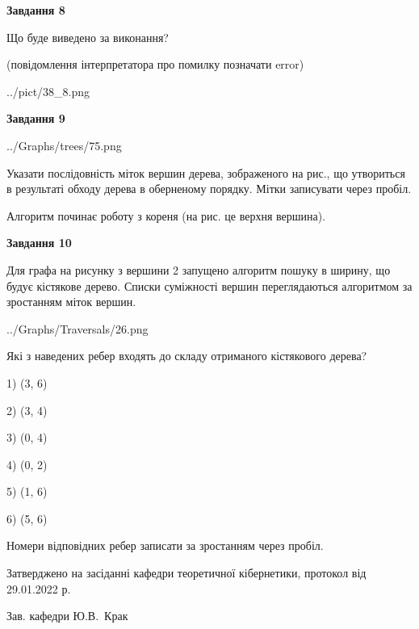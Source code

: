 \documentclass[12pt, ukrainian]{article}
\begin{document}
{\begin {large}
{\begin {center}\textbf{Завдання 8}\end {center}}\par
Що буде виведено за виконання?\par
 (повідомлення інтерпретатора про помилку позначати error)\par
\begin{center}
	{../pict/38_8.png}
\end{center}
\newpage

{\begin {center}\textbf{Завдання 9}\end {center}}\par

\begin{center}
	{../Graphs/trees/75.png}
\end{center}
Указати послідовність міток вершин дерева, зображеного на рис., що утвориться в результаті обходу дерева в оберненому порядку. Мітки записувати через пробіл.\par Алгоритм починає роботу з кореня (на рис. це верхня вершина).\par
\newpage

{\begin {center}\textbf{Завдання 10}\end {center}}\par
Для графа на рисунку з вершини 2 запущено алгоритм пошуку в ширину, що будує кістякове дерево. Списки суміжності вершин переглядаються алгоритмом за зростанням міток вершин.\par
\begin{center}
	{../Graphs/Traversals/26.png}
\end{center}
\par Які з наведених ребер входять до складу отриманого кістякового дерева?\par
1) (3, 6)\par
2) (3, 4)\par
3) (0, 4)\par
4) (0, 2)\par
5) (1, 6)\par
6) (5, 6)\par
{\vskip 15pt} Номери відповідних ребер записати за зростанням через пробіл.\par
\newpage


\end {large}
}
{\smallskip \begin {small} Затверджено на засіданні кафедри теоретичної кібернетики, протокол  від   29.01.2022 р.\par\smallskip\smallskip
{\parbox {6.5 cm}{Зав. кафедри \dotfill Ю.В.~Крак}} \end{small}}
\end{document}
